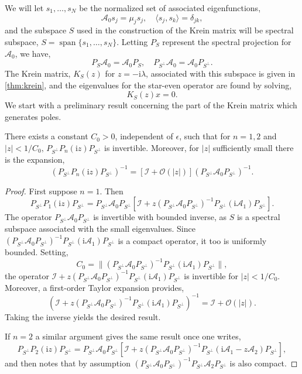 \documentclass[review,onefignum,onetabnum]{siamart171218}
\def\Span{\mathop\mathrm{span}\nolimits}
\newcommand{\rmi}{\mathrm{i}}
\newcommand{\calA}{\mathcal{A}}
\newcommand{\calI}{\mathcal{I}}
\newcommand{\calO}{\mathcal{O}}
\newcommand{\vK}{\bm{\mathit{K}}}
\newcommand{\vx}{\bm{\mathit{x}}}
\begin{document}
We will let $s_1,\dots,s_N$ be the normalized set of associated eigenfunctions,
\[
\calA_0s_j=\mu_js_j,\quad\langle s_j,s_k\rangle=\delta_{jk},
\]
and the subspace $S$ used in the construction of the Krein matrix will be spectral subspace, $S=\Span\{s_1,\dots,s_N\}$. Letting $P_S$ represent the spectral projection for $\calA_0$, we have,
\[
P_S\calA_0=\calA_0P_S,\quad
P_{S^\perp}\calA_0=\calA_0P_{S^\perp}.
\]
The Krein matrix, $\vK_S(z)$ for $z=-\rmi\lambda$, associated with this subspace is given in \cref{thm:krein}, and the eigenvalues for the star-even operator are found by solving,
\begin{equation}\label{e:51aa}
\vK_S(z)\vx=0.
\end{equation}
We start with a preliminary result concerning the part of the Krein matrix which generates poles.

\begin{lemma}\label{l:51}
There exists a constant $C_0>0$, independent of $\epsilon$, such that for $n=1,2$ and $|z|<1/C_0,\,P_{S^\perp}P_n(\rmi z)P_{S^\perp}$ is invertible. Moreover, for $|z|$ sufficiently small there is the expansion,
\[
\left(P_{S^\perp}P_n(\rmi z)P_{S^\perp}\right)^{-1}=
\left[\calI+\calO(|z|)\right]\left(P_{S^\perp}\calA_0P_{S^\perp}\right)^{-1}.
\]
\end{lemma}

\begin{proof}
First suppose $n=1$. Then
\[
P_{S^\perp}P_1(\rmi z)P_{S^\perp}=P_{S^\perp}\calA_0P_{S^\perp}
\left[\calI+z
\left(P_{S^\perp}\calA_0P_{S^\perp}\right)^{-1}P_{S^\perp}(\rmi\calA_1)P_{S^\perp}\right].
\]
The operator $P_{S^\perp}\calA_0P_{S^\perp}$ is invertible with bounded inverse, as $S$ is a spectral subspace associated with the small eigenvalues. Since $\left(P_{S^\perp}\calA_0P_{S^\perp}\right)^{-1}P_{S^\perp}(\rmi\calA_1)P_{S^\perp}$ is a compact operator, it too is uniformly bounded. Setting,
\[
C_0=\|\left(P_{S^\perp}\calA_0P_{S^\perp}\right)^{-1}P_{S^\perp}(\rmi\calA_1)P_{S^\perp}\|,
\]
the operator $\calI+z
\left(P_{S^\perp}\calA_0P_{S^\perp}\right)^{-1}P_{S^\perp}(\rmi\calA_1)P_{S^\perp}$ is invertible for $|z|<1/C_0$. Moreover, a first-order Taylor expansion provides,
\[
\left(\calI+z
\left(P_{S^\perp}\calA_0P_{S^\perp}\right)^{-1}P_{S^\perp}(\rmi\calA_1)P_{S^\perp}\right)^{-1}=\calI+\calO(|z|).
\]
Taking the inverse yields the desired result.

If $n=2$ a similar argument gives the same result once one writes,
\[
P_{S^\perp}P_2(\rmi z)P_{S^\perp}=P_{S^\perp}\calA_0P_{S^\perp}
\left[\calI+z
\left(P_{S^\perp}\calA_0P_{S^\perp}\right)^{-1}P_{S^\perp}\left(\rmi\calA_1-z\calA_2\right)P_{S^\perp}\right],
\]
and then notes that by assumption $\left(P_{S^\perp}\calA_0P_{S^\perp}\right)^{-1}P_{S^\perp}\calA_2P_{S^\perp}$ is also compact.
\end{proof}
\end{document}
